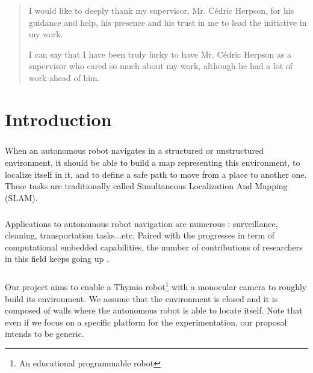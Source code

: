 \documentclass[12pt]{report}
\newenvironment{acknowledgements}[1]
{\renewcommand{\abstractname}{Acknowledgements}
\begin{abstract}}
{\end{abstract}}
\begin{document}
	
	\begin{acknowledgements}
	\centering
		
	
	I would like to deeply thank my supervisor, Mr. Cédric Herpson, for his guidance and help, his presence and his trust in me to lead the initiative in my work. 
	
	I can say that I have been truly lucky to have Mr. Cédric Herpson as a supervisor who cared so much about my work, although he had a lot of work ahead of him. 
	
	\end{acknowledgements}
		
	\tableofcontents
	\thispagestyle{empty}
	
	
	\setcounter{page}{0}
	
	\chapter*{Introduction}
	\paragraph{}
	When an autonomous robot navigates in a structured or unstructured environment, it should be able to build a map 
representing this environment, to localize itself in it, and to define a safe path to move from a place to another 
one. These tasks are traditionally called Simultaneous Localization And Mapping (SLAM).
	
	\paragraph{}
Applications to autonomous robot navigation are numerous : surveillance, cleaning, transportation 
tasks...etc. Paired with the progresses in term of computational embedded capabilities, the number of 
contributions of researchers in this field keeps going up \cite{bonin-font_visual_2008}.
	
	\paragraph{}
	Our project aims to enable a Thymio robot\footnote{An educational programmable robot} with a 
monocular camera to roughly build its environment. We assume that  the environment is closed and it is 
composed of walls where the autonomous robot is able to locate itself. Note that even if we focus on a specific 
platform for the experimentation, our proposal intends to be generic.
	
\end{document}
